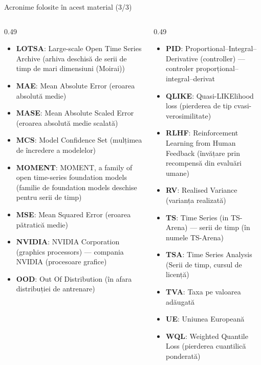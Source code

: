 \begin{frame}{Acronime folosite în acest material (3/3)}
\begin{columns}[T]
\begin{column}{0.49\textwidth}
\begin{itemize}\setlength{\itemsep}{0pt}
    \item \textbf{LOTSA}: Large-scale Open Time Series Archive (arhiva deschisă de serii de timp de mari dimensiuni (Moirai))
    \item \textbf{MAE}: Mean Absolute Error (eroarea absolută medie)
    \item \textbf{MASE}: Mean Absolute Scaled Error (eroarea absolută medie scalată)
    \item \textbf{MCS}: Model Confidence Set (mulțimea de încredere a modelelor)
    \item \textbf{MOMENT}: MOMENT, a family of open time-series foundation models (familie de foundation models deschise pentru serii de timp)
    \item \textbf{MSE}: Mean Squared Error (eroarea pătratică medie)
    \item \textbf{NVIDIA}: NVIDIA Corporation (graphics processors) — compania NVIDIA (procesoare grafice)
    \item \textbf{OOD}: Out Of Distribution (în afara distribuției de antrenare)
\end{itemize}
\end{column}
\begin{column}{0.49\textwidth}
\begin{itemize}\setlength{\itemsep}{0pt}
    \item \textbf{PID}: Proportional--Integral--Derivative (controller) — controler proporțional--integral--derivat
    \item \textbf{QLIKE}: Quasi-LIKElihood loss (pierderea de tip cvasi-verosimilitate)
    \item \textbf{RLHF}: Reinforcement Learning from Human Feedback (învățare prin recompensă din evaluări umane)
    \item \textbf{RV}: Realised Variance (varianța realizată)
    \item \textbf{TS}: Time Series (in TS-Arena) — serii de timp (în numele TS-Arena)
    \item \textbf{TSA}: Time Series Analysis (Serii de timp, cursul de licență)
    \item \textbf{TVA}: Taxa pe valoarea adăugată
    \item \textbf{UE}: Uniunea Europeană
    \item \textbf{WQL}: Weighted Quantile Loss (pierderea cuantilică ponderată)
\end{itemize}
\end{column}
\end{columns}
\end{frame}

